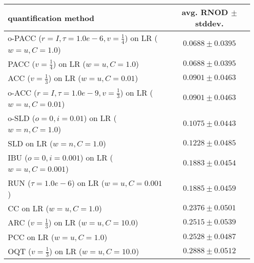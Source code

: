 \begin{tabular}{lc}
  \toprule
  quantification method & avg. RNOD $\pm$ stddev. \\
  \midrule
  o-PACC ($r=I, \tau=1.0e-6, v=\frac{1}{4}$) on LR ($w=u, C=1.0$) & $\mathbf{0.0688 \pm 0.0395}$ \\
  PACC ($v=\frac{1}{4}$) on LR ($w=u, C=1.0$) & $\mathbf{0.0688 \pm 0.0395}$ \\
  ACC ($v=\frac{1}{3}$) on LR ($w=u, C=0.01$) & $0.0901 \pm 0.0463$ \\
  o-ACC ($r=I, \tau=1.0e-9, v=\frac{1}{3}$) on LR ($w=u, C=0.01$) & $0.0901 \pm 0.0463$ \\
  o-SLD ($o=0, i=0.01$) on LR ($w=n, C=1.0$) & $0.1075 \pm 0.0443$ \\
  SLD on LR ($w=n, C=1.0$) & $0.1228 \pm 0.0485$ \\
  IBU ($o=0, i=0.001$) on LR ($w=u, C=0.001$) & $0.1883 \pm 0.0454$ \\
  RUN ($\tau=1.0e-6$) on LR ($w=u, C=0.001$) & $0.1885 \pm 0.0459$ \\
  CC on LR ($w=u, C=1.0$) & $0.2376 \pm 0.0501$ \\
  ARC ($v=\frac{1}{3}$) on LR ($w=u, C=10.0$) & $0.2515 \pm 0.0539$ \\
  PCC on LR ($w=u, C=1.0$) & $0.2528 \pm 0.0487$ \\
  OQT ($v=\frac{1}{3}$) on LR ($w=u, C=10.0$) & $0.2888 \pm 0.0512$ \\
  \bottomrule
\end{tabular}
